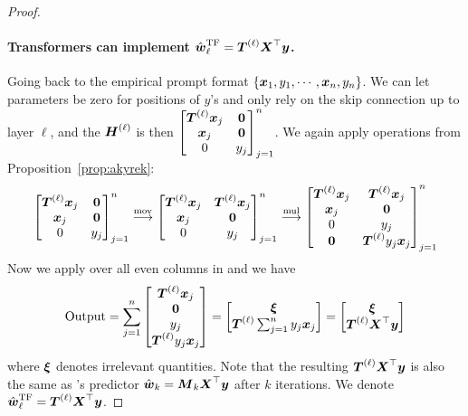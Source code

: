 \begin{proof}
\paragraph{Transformers can implement $\hat{\boldsymbol{w}}_\ell^\mathrm{TF} = \boldsymbol{T}^{(\ell)} \boldsymbol{X}^\top \boldsymbol{y}$.}
Going back to the empirical prompt format $\{\boldsymbol{x}_1, y_1, \cdots, \boldsymbol{x}_n, y_n\}$. We can let parameters be zero for positions of $y$'s and only rely on the skip connection up to layer $\ell$, and the $\boldsymbol{H}^{(\ell)}$ is then $\begin{bmatrix}
           \boldsymbol{T}^{(\ell)} \boldsymbol{x}_j & \boldsymbol{0}  \\
            \boldsymbol{x}_j &  \boldsymbol{0} \\
            0 & y_j
        \end{bmatrix}_{j=1}^n $. We again apply operations from Proposition~\ref{prop:akyrek}:
\begin{equation}
    \begin{bmatrix}
           \boldsymbol{T}^{(\ell)} \boldsymbol{x}_j & \boldsymbol{0}  \\
            \boldsymbol{x}_j &  \boldsymbol{0} \\
            0 & y_j
        \end{bmatrix}_{j=1}^n \overset{\mathrm{mov}}{\longrightarrow} \begin{bmatrix}
           \boldsymbol{T}^{(\ell)} \boldsymbol{x}_j & \boldsymbol{T}^{(\ell)} \boldsymbol{x}_j  \\
            \boldsymbol{x}_j & \boldsymbol{0} \\
            0 & y_j
        \end{bmatrix}_{j=1}^n \overset{\mathrm{mul}}{\longrightarrow} \begin{bmatrix}
            \boldsymbol{T}^{(\ell)} \boldsymbol{x}_j & \boldsymbol{T}^{(\ell)}\boldsymbol{x}_j  \\
             \boldsymbol{x}_j & \boldsymbol{0} \\
             0 & y_j \\
        \boldsymbol{0} & \boldsymbol{T}^{(\ell)} y_j \boldsymbol{x}_j 
        \end{bmatrix}_{j=1}^n 
\label{eqn:Tyjxj}
\end{equation}
Now we apply  over all even columns in  and we have 
\begin{equation}
    \mathrm{Output} = \sum_{j=1}^n \begin{bmatrix}
         \boldsymbol{T}^{(\ell)}\boldsymbol{x}_j \\ \boldsymbol{0} \\ y_j \\  \boldsymbol{T}^{(\ell)} y_j \boldsymbol{x}_j 
    \end{bmatrix} = \begin{bmatrix}
        \boldsymbol{\xi} \\ \boldsymbol{T}^{(\ell)} \sum_{j=1}^n y_j \boldsymbol{x}_j 
    \end{bmatrix} = \begin{bmatrix}
        \boldsymbol{\xi} \\ \boldsymbol{T}^{(\ell)} \boldsymbol{X}^\top \boldsymbol{y} 
    \end{bmatrix}
\end{equation}
where $\boldsymbol{\xi}$ denotes irrelevant quantities. Note that the resulting $\boldsymbol{T}^{(\ell)} \boldsymbol{X}^\top \boldsymbol{y} $ is also the same as \newton's predictor $\hat{\boldsymbol{w}}_k = \boldsymbol{M}_k \boldsymbol{X}^\top \boldsymbol{y}$ after $k$ iterations. We denote $\hat{\boldsymbol{w}}_\ell^\mathrm{TF} = \boldsymbol{T}^{(\ell)} \boldsymbol{X}^\top \boldsymbol{y}$.


\end{proof}
